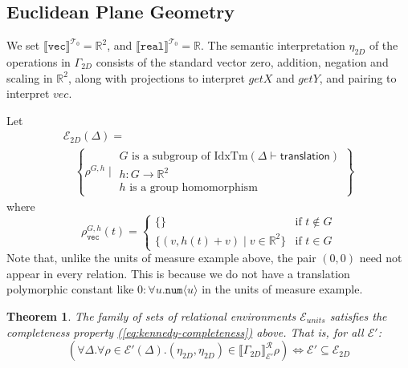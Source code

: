 \documentclass[natbib,preprint]{sigplanconf}
\newcommand{\sepbar}{\mathrel|}
\newcommand{\idxTms}[2]{\mathrm{IdxTm}(#1 \vdash #2)}
\newcommand{\tyPrim}[2]{\texttt{#1}\langle #2 \rangle}
\newcommand{\tyPrimNm}[1]{\texttt{#1}}
\newcommand{\relEnv}[1]{\mathcal{#1}}
\newcommand{\tyPrimSem}[1]{\llbracket \tyPrimNm{#1} \rrbracket^{\mathcal{T}_0}}
\newcommand{\rsem}[3]{\llbracket #1 \rrbracket^{\mathcal{R}}_{#2}{#3}}
\newtheorem{theorem}{Theorem}
\begin{document}
\subsection{Euclidean Plane Geometry}\label{sec:2d-semantics}

We set $\tyPrimSem{vec} = \mathbb{R}^2$, and $\tyPrimSem{real} =
\mathbb{R}$. The semantic interpretation $\eta_{\mathit{2D}}$ of the
operations in $\Gamma_{\mathit{2D}}$ consists of the standard vector
zero, addition, negation and scaling in $\mathbb{R}^2$, along with
projections to interpret $\mathit{getX}$ and $\mathit{getY}$, and
pairing to interpret $\mathit{vec}$.

Let
\begin{displaymath}
  \begin{array}{l}
    \relEnv{E}_{\mathit{2D}}(\Delta) = \\
    \quad\left\{ \rho^{G,h} \sepbar
      \begin{array}{l}
        G\textrm{ is a subgroup of }\idxTms{\Delta}{\mathsf{translation}} \\
        h : G \to \mathbb{R}^2 \\
        h\textrm{ is a group homomorphism}
      \end{array}
    \right\}
  \end{array}
\end{displaymath}
where
\begin{displaymath}
  \rho^{G,h}_{\tyPrimNm{vec}}(t) = \left\{
    \begin{array}{ll}
      \{\} & \textrm{if }t \not\in G \\
      \{(v,h(t) + v) \sepbar v \in \mathbb{R}^2 \} & \textrm{if }t \in G
    \end{array}
  \right.
\end{displaymath}
Note that, unlike the units of measure example above, the pair $(0,0)$
need not appear in every relation. This is because we do not have a
translation polymorphic constant like $0 : \forall u. \tyPrim{num}{u}$
in the units of measure example.

\begin{theorem}
  The family of sets of relational environments
  $\relEnv{E}_{\mathit{units}}$ satisfies the completeness property
  \hyperref[eq:kennedy-completeness]{(\ref*{eq:kennedy-completeness})}
  above. That is, for all $\relEnv{E}'$:
  \begin{displaymath}
    (\forall \Delta.\forall \rho \in \relEnv{E}'(\Delta). (\eta_{\mathit{2D}}, \eta_{\mathit{2D}}) \in \rsem{\Gamma_{\mathit{2D}}}{\relEnv{E}'}{\rho}) \Leftrightarrow \relEnv{E}'\subseteq \relEnv{E}_{\mathit{2D}}
  \end{displaymath}
\end{theorem}
\end{document}
